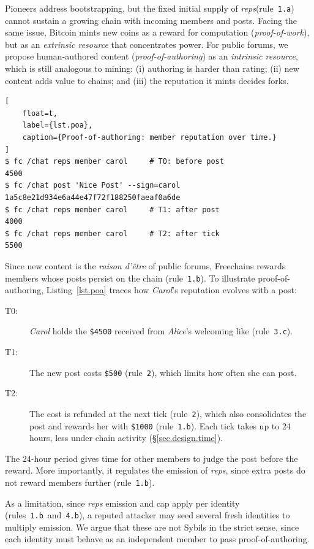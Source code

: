 \documentclass[10pt,twocolumn]{article}
\newcommand{\FC}       {Freechains\xspace}
\newcommand{\R}[1]     {rule~\code{#1}\xspace}
\newcommand{\reps}     {\emph{reps}\xspace}
\newcommand{\nreps}[1] {\code{\$#1\xspace}}
\newcommand{\code}[1]  {\texttt{\small{#1}}}
\begin{document}
Pioneers address bootstrapping, but the fixed initial supply of \reps (\R{1.a})
cannot sustain a growing chain with incoming members and posts.
%
Facing the same issue, Bitcoin mints new coins as a reward for computation
(\emph{proof-of-work}), but as an \emph{extrinsic resource} that concentrates
power.
For public forums, we propose human-authored content
(\emph{proof-of-authoring}) as an \emph{intrinsic resource}, which is still
analogous to mining:
    (i)   authoring is harder than rating;
    (ii)  new content adds value to chains; and
    (iii) the reputation it mints decides forks.

\begin{lstlisting}[
    float=t,
    label={lst.poa},
    caption={Proof-of-authoring: member reputation over time.}
]
$ fc /chat reps member carol     # T0: before post
4500
$ fc /chat post 'Nice Post' --sign=carol
1a5c8e21d934e6a44e47f72f188250faeaf0a6de
$ fc /chat reps member carol     # T1: after post
4000
$ fc /chat reps member carol     # T2: after tick
5500
\end{lstlisting}

Since new content is the \emph{raison d'être} of public forums, \FC rewards
members whose posts persist on the chain (\R{1.b}).
%
To illustrate proof-of-authoring, Listing~\ref{lst.poa} traces how
\emph{Carol}'s reputation evolves with a post:
%
\begin{description}
\item[T0:] \emph{Carol} holds the \nreps{4500} received from \emph{Alice}'s
    welcoming like (\R{3.c}).
\item[T1:] The new post costs \nreps{500} (\R{2}), which limits how often
    she can post.
\item[T2:] The cost is refunded at the next tick (\R{2}), which also
    consolidates the post and rewards her with \nreps{1000} (\R{1.b}).
    Each tick takes up to 24 hours, less under chain activity
    (\S\ref{sec.design.time}).
\end{description}

The 24-hour period gives time for other members to judge the post before the
reward.
More importantly, it regulates the emission of \reps, since extra posts do not
reward members further (\R{1.b}).

As a limitation, since \reps emission and cap apply per identity
(rules~\code{1.b}~and~\code{4.b}), a reputed attacker may seed several fresh
identities to multiply emission.
%
We argue that these are not Sybils in the strict sense, since each identity
must behave as an independent member to pass proof-of-authoring.
\end{document}
